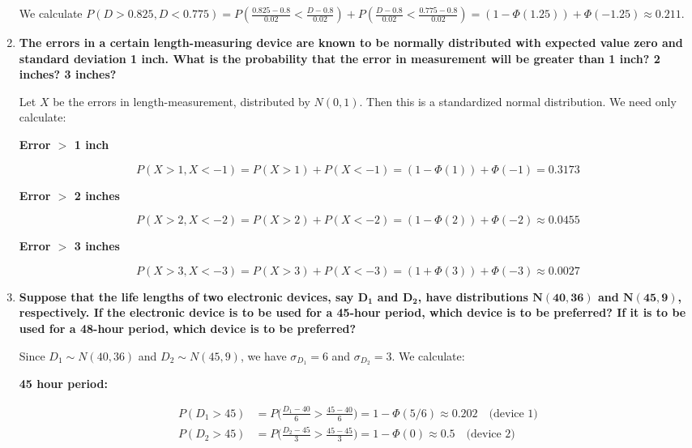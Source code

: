 \documentclass[10pt, oneside]{article}   	%
\theoremstyle{definition}
\begin{document}
\begin{enumerate}[label=9.\arabic*]
We calculate $P(D > 0.825, D < 0.775) = P(\frac{0.825 - 0.8}{0.02} < \frac{D - 0.8}{0.02}) + P(\frac{D - 0.8}{0.02} < \frac{0.775 - 0.8}{0.02}) = (1 - \Phi(1.25)) + \Phi(-1.25) \approx \boxed{0.211}$.

\item  \begin{tcolorbox}[
  colback=Cerulean!5!white,
  colframe=Cerulean!75!black]
\textbf{The errors in a certain length-measuring device are known to be normally distributed with expected value zero and standard deviation 1 inch. What is the probability that the error in measurement will be greater than 1 inch? 2 inches? 3 inches?}
\end{tcolorbox}

Let $X$ be the errors in length-measurement, distributed by $N(0,1)$. Then this is a standardized normal distribution. We need only calculate:

\textbf{Error $\bm{>}$ 1 inch}

\[ P(X > 1, X < -1) = P(X > 1) + P(X < -1) = (1 - \Phi(1)) + \Phi(-1) = \boxed{0.3173} \]

\textbf{Error $\bm{>}$ 2 inches}

\[ P(X > 2, X < -2) = P(X > 2) + P(X < -2) = (1 - \Phi(2)) + \Phi(-2) \approx \boxed{0.0455} \]

\textbf{Error $\bm{>}$ 3 inches}

\[ P(X > 3, X < -3) = P(X > 3) + P(X < -3) = (1 + \Phi(3)) + \Phi(-3) \approx \boxed{0.0027} \]

\item  \begin{tcolorbox}[
  colback=Cerulean!5!white,
  colframe=Cerulean!75!black]
\textbf{Suppose that the life lengths of two electronic devices, say $\bm{D_1}$ and $\bm{D_2}$, have distributions $\bm{N(40,36)}$ and $\bm{N(45,9)}$, respectively. If the electronic device is to be used for a 45-hour period, which device is to be preferred? If it is to be used for a 48-hour period, which device is to be preferred?}
\end{tcolorbox}

Since $D_1 \sim N(40,36)$ and $D_2 \sim N(45,9)$, we have $\sigma_{D_1} = 6$ and $\sigma_{D_2} = 3$. We calculate:

\textbf{45 hour period:}

\begin{align*}
P(D_1 > 45) &= P \bigg( \frac{D_1-40}{6} > \frac{45-40}{6} \bigg) = 1 - \Phi(5/6) \approx \boxed{0.202 \quad \text{(device 1)}} \\
P(D_2 > 45) &= P \bigg( \frac{D_2 - 45}{3} > \frac{45-45}{3} \bigg) = 1 - \Phi(0) \approx \boxed{0.5 \quad \text{(device 2)}}
\end{align*}


\end{enumerate}
\end{document}
